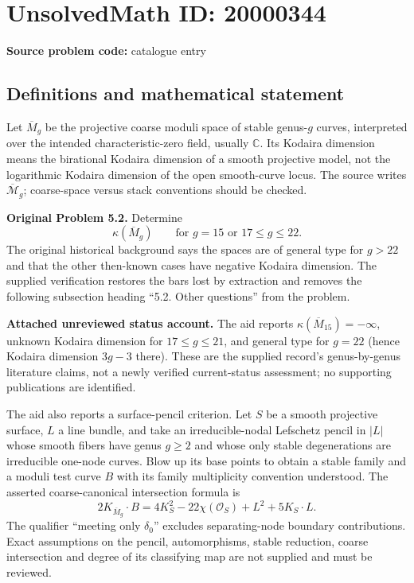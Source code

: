 \documentclass[11pt]{article}
\newcommand{\C}{\mathbb{C}}
\begin{document}
\section*{UnsolvedMath ID: 20000344}
\textbf{Source problem code:} catalogue entry
\subsection{Definitions and mathematical statement}
Let $\overline M_g$ be the projective coarse moduli space of stable genus-$g$ curves, interpreted over the intended characteristic-zero field, usually $\C$. Its Kodaira dimension means the birational Kodaira dimension of a smooth projective model, not the logarithmic Kodaira dimension of the open smooth-curve locus. The source writes $\overline{\mathcal M}_g$; coarse-space versus stack conventions should be checked.

\textbf{Original Problem 5.2.} Determine
\[\kappa(\overline M_g)\qquad\text{for }g=15\text{ or }17\le g\le22.\]
The original historical background says the spaces are of general type for $g>22$ and that the other then-known cases have negative Kodaira dimension. The supplied verification restores the bars lost by extraction and removes the following subsection heading ``5.2. Other questions'' from the problem.

\textbf{Attached unreviewed status account.} The aid reports $\kappa(\overline M_{15})=-\infty$, unknown Kodaira dimension for $17\le g\le21$, and general type for $g=22$ (hence Kodaira dimension $3g-3$ there). These are the supplied record's genus-by-genus literature claims, not a newly verified current-status assessment; no supporting publications are identified.

The aid also reports a surface-pencil criterion. Let $S$ be a smooth projective surface, $L$ a line bundle, and take an irreducible-nodal Lefschetz pencil in $|L|$ whose smooth fibers have genus $g\ge2$ and whose only stable degenerations are irreducible one-node curves. Blow up its base points to obtain a stable family and a moduli test curve $B$ with its family multiplicity convention understood. The asserted coarse-canonical intersection formula is
\[2K_{\overline M_g}\cdot B=4K_S^2-22\chi(\mathcal O_S)+L^2+5K_S\cdot L.\]
The qualifier ``meeting only $\delta_0$'' excludes separating-node boundary contributions. Exact assumptions on the pencil, automorphisms, stable reduction, coarse intersection and degree of its classifying map are not supplied and must be reviewed.
\end{document}
